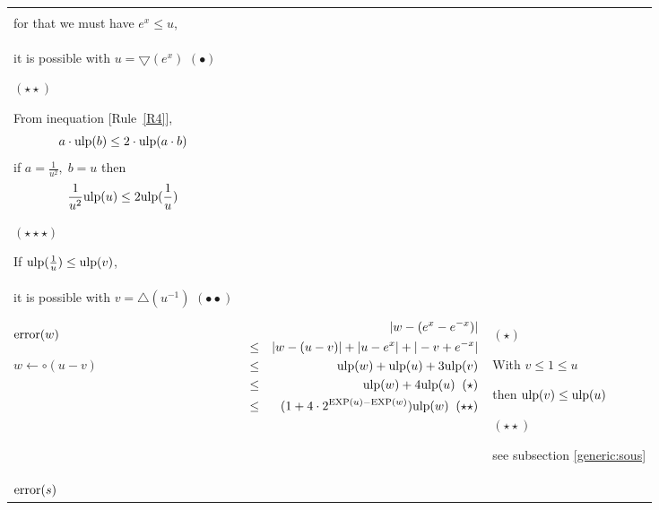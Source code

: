 \documentclass[12pt]{amsart}
\def\pinf{\bigtriangleup}
\def\minf{\bigtriangledown}
\def\ulp{{\rm ulp}}
\def\Exp{{\rm EXP}}
\newcommand{\U}[1]{\quad \mbox{[Rule~\ref{#1}]}}
\begin{document}
\begin{center}
\begin{tabular}{l l l}
\begin{minipage}{7.5cm}
\end{minipage} &
\begin{minipage}{6cm}

$(\star)$

With $\frac{1}{u} \leq \frac{1}{e^x}$,\\
for that we must have $e^x \leq u$,\\
it is possible with $u=\minf(e^x)$ $(\bullet)$

$(\star\star)$

From inequation \U{R4},
\[   a \cdot \ulp(b) \leq 2 \cdot \ulp(a \cdot b)\]
if $a =\frac{1}{u^2},\;b = u$ then
\[ \frac{1}{u^2} \ulp(u)  \leq 2 \ulp(\frac{1}{u})\]

$(\star\star\star)$

If $\ulp(\frac{1}{u}) \leq \ulp(v)$,\\
it is possible with $v=\pinf(u^{-1})$ $(\bullet\bullet)$



\end{minipage}\\%
\begin{minipage}{2.5cm}
${\textnormal{error}}(w)$


$w \leftarrow \circ(u-v) $
\end{minipage} &
\begin{minipage}{7.8cm}



\begin{eqnarray}\nonumber
  &&|w-(e^{x}-e^{-x})| \\\nonumber
  &       \leq&  |w - (u-v)|+|u - e^x|+|-v + e^{-x}|\\\nonumber
  &       \leq& \ulp(w) + \ulp(u) + 3\ulp(v)\\\nonumber
  &       \leq& \ulp(w) + 4\ulp(u)\;\;(\star)\\\nonumber
  &       \leq& (1+ 4 \cdot 2^{\Exp(u)-\Exp(w)}) \ulp(w)\;\;(\star\star)\\\nonumber
\end{eqnarray}


\end{minipage} &
\begin{minipage}{6cm}

$(\star)$

With $v \leq 1\leq u$

then $\ulp(v) \leq \ulp(u)$

$(\star\star)$

see subsection \ref{generic:sous}

\end{minipage}\\%
\begin{minipage}{2.5cm}
${\textnormal{error}}(s)$


\end{minipage}
\end{tabular}
\end{center}
\end{document}
